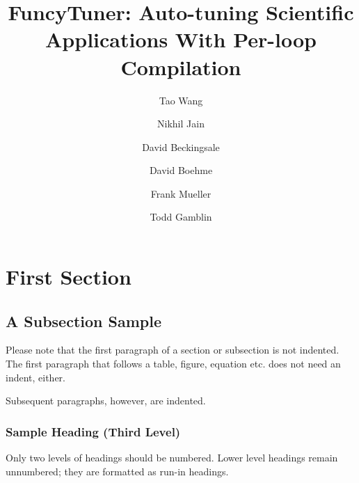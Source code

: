 \documentclass[runningheads]{llncs}
\begin{document}
%
\title{FuncyTuner: Auto-tuning Scientific Applications With Per-loop Compilation}
%
%
\author{Tao Wang \and
Nikhil Jain \and
David Beckingsale \and
David Boehme \and
Frank Mueller \and
Todd Gamblin}
%
%
%
\maketitle              %
%
\begin{abstract}



\end{abstract}
%
%
%







\section{First Section}
\subsection{A Subsection Sample}
Please note that the first paragraph of a section or subsection is
not indented. The first paragraph that follows a table, figure,
equation etc. does not need an indent, either.

Subsequent paragraphs, however, are indented.

\subsubsection{Sample Heading (Third Level)} Only two levels of
headings should be numbered. Lower level headings remain unnumbered;
they are formatted as run-in headings.
\end{document}
